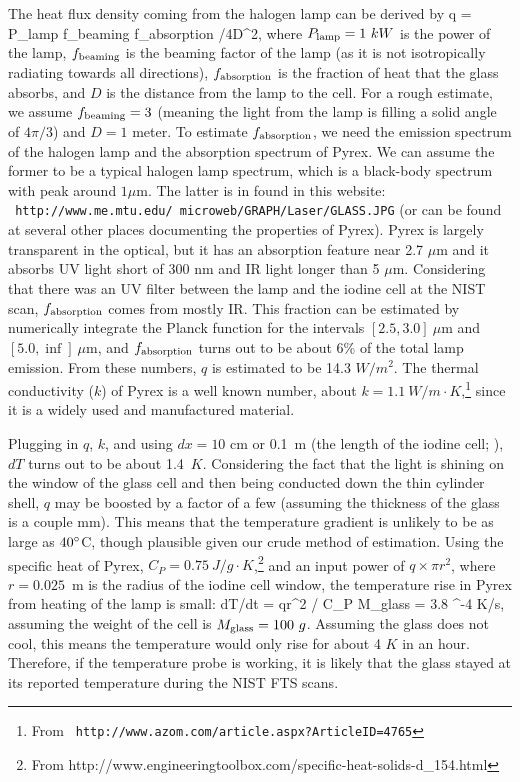 The heat flux density coming from the halogen lamp can be derived by
\beq
q = P_{\rm lamp} \cdot f_{\rm beaming} \cdot f_{\rm absorption} /4\pi D^2,
\eeq
where $P_{\rm lamp}=1\ kW$ is the power of the lamp, $f_{\rm beaming}$
is the beaming factor of the lamp (as it is not isotropically
radiating towards all directions), $f_{\rm absorption}$ is the
fraction of heat that the glass absorbs, and $D$ is the distance from
the lamp to the cell. For a rough estimate, we assume $f_{\rm
beaming}=3$ (meaning the light from the lamp is filling a solid angle
of $4\pi/3$) and $D=1$ meter. To estimate $f_{\rm absorption}$, we
need the emission spectrum of the halogen lamp and the absorption
spectrum of Pyrex. We can assume the former to be a typical halogen
lamp spectrum, which is a black-body spectrum with peak around
$1 \mu$m. The latter is in found in this website: \\ {\tt
http://www.me.mtu.edu/~microweb/GRAPH/Laser/GLASS.JPG} (or can be
found at several other places documenting the properties of
Pyrex). Pyrex is largely transparent in the optical, but it has an
absorption feature near 2.7 $\mu$m and it absorbs UV light short of
300 nm and IR light longer than 5 $\mu$m. Considering that there was
an UV filter between the lamp and the iodine cell at the NIST scan,
$f_{\rm absorption}$ comes from mostly IR. This fraction can be
estimated by numerically integrate the Planck function for the
intervals $[2.5,3.0]\ \mu$m and $[5.0, \inf]\ \mu$m, and $f_{\rm
absorption}$ turns out to be about 6\% of the total lamp
emission. From these numbers, $q$ is estimated to be 14.3 $W/m^2$. The
thermal conductivity ($k$) of Pyrex is a well known number, about
$k=1.1\ W/m\cdot K$,\footnote{From {\tt
http://www.azom.com/article.aspx?ArticleID=4765}} since it is a widely
used and manufactured material.

Plugging in $q$, $k$, and using $dx=10$ cm or 0.1~m (the length of the
iodine cell; \citealt{butler1996}), $dT$ turns out to be about
1.4~$K$. Considering the fact that the light is shining on the window
of the glass cell and then being conducted down the thin cylinder
shell, $q$ may be boosted by a factor of a few
(assuming the thickness of the glass is a couple mm). This
means that the temperature gradient is unlikely to be as large
as $40^{\circ}$C, though plausible given our crude method of
estimation. Using the specific heat of Pyrex, $C_P = 0.75\ J/g\cdot
K$,\footnote{From
http://www.engineeringtoolbox.com/specific-heat-solids-d\_154.html} and
an input power of $q \times \pi r^2$, where $r=0.025$~m is the radius
of the iodine cell window, the temperature rise in Pyrex from heating
of the lamp is small:
\beq
dT/dt = q\cdot \pi r^2 / C_P M_{\rm glass} = 3.8 ^{-4} K/s,
\eeq
assuming the weight of the cell is $M_{\rm glass} = 100\ g$. Assuming
the glass does not cool, this means the temperature would only rise
for about 4 $K$ in an hour. Therefore, if the temperature probe is
working, it is likely that the glass stayed at its reported
temperature during the NIST FTS scans.

